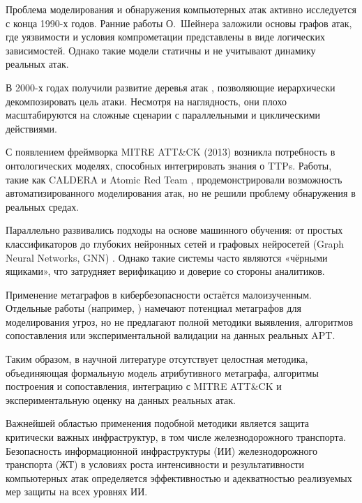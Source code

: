 Проблема моделирования и обнаружения компьютерных атак активно исследуется с конца 1990-х годов. Ранние работы О.~Шейнера \autocite{Schneier1999} заложили основы графов атак, где уязвимости и условия компрометации представлены в виде логических зависимостей. Однако такие модели статичны и не учитывают динамику реальных атак.

В 2000-х годах получили развитие деревья атак \autocite{Sheyner2002}, позволяющие иерархически декомпозировать цель атаки. Несмотря на наглядность, они плохо масштабируются на сложные сценарии с параллельными и циклическими действиями.

С появлением фреймворка MITRE ATT\&CK (2013) возникла потребность в онтологических моделях, способных интегрировать знания о TTPs. Работы, такие как CALDERA \autocite{CALDERA2017} и Atomic Red Team \autocite{AtomicRedTeam}, продемонстрировали возможность автоматизированного моделирования атак, но не решили проблему обнаружения в реальных средах.

Параллельно развивались подходы на основе машинного обучения: от простых классификаторов до глубоких нейронных сетей и графовых нейросетей (Graph Neural Networks, GNN)
\ifsynopsis
\else
\fi. Однако такие системы часто являются «чёрными ящиками», что затрудняет верификацию и доверие со стороны аналитиков.

Применение метаграфов в кибербезопасности остаётся малоизученным. Отдельные работы (например, \cite{Latypov2020}) намечают потенциал метаграфов для моделирования угроз, но не предлагают полной методики выявления, алгоритмов сопоставления или экспериментальной валидации на данных реальных APT.

Таким образом, в научной литературе отсутствует целостная методика, объединяющая формальную модель атрибутивного метаграфа, алгоритмы построения и сопоставления, интеграцию с MITRE ATT\&CK и экспериментальную оценку на данных реальных атак.

Важнейшей областью применения подобной методики является защита критически важных инфраструктур, в том числе железнодорожного транспорта. Безопасность информационной инфраструктуры (ИИ)
\ifsynopsis
\else
\fi железнодорожного транспорта (ЖТ)
\ifsynopsis
\else
\fi в условиях роста интенсивности и результативности компьютерных атак определяется эффективностью и адекватностью реализуемых мер защиты на всех уровнях ИИ.

